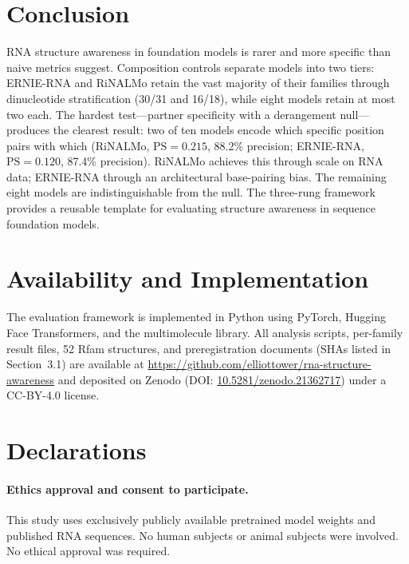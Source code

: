 \documentclass[11pt]{article}
\begin{document}
\section{Conclusion}

RNA structure awareness in foundation models is rarer and more
specific than naive metrics suggest. Composition controls separate
models into two tiers: ERNIE-RNA and RiNALMo retain the vast majority
of their families through dinucleotide stratification (30/31 and
16/18), while eight models retain at most two each. The hardest
test---partner specificity with a derangement null---produces the
clearest result: two of ten models encode which specific position
pairs with which (RiNALMo, $\text{PS} = 0.215$, 88.2\% precision;
ERNIE-RNA, $\text{PS} = 0.120$, 87.4\% precision). RiNALMo achieves
this through scale on RNA data; ERNIE-RNA through an architectural
base-pairing bias. The remaining eight models are indistinguishable
from the null. The three-rung framework provides a reusable template
for evaluating structure awareness in sequence foundation models.


\section*{Availability and Implementation}

The evaluation framework is implemented in Python using PyTorch,
Hugging Face Transformers, and the multimolecule library. All analysis
scripts, per-family result files, 52 Rfam structures, and
preregistration documents (SHAs listed in Section~3.1) are available at
\url{https://github.com/elliottower/rna-structure-awareness} and
deposited on Zenodo (DOI:
\href{https://doi.org/10.5281/zenodo.21362717}{10.5281/zenodo.21362717})
under a CC-BY-4.0 license.

\section*{Declarations}

\paragraph{Ethics approval and consent to participate.}
This study uses exclusively publicly available pretrained model weights
and published RNA sequences. No human subjects or animal subjects were
involved. No ethical approval was required.
\end{document}
